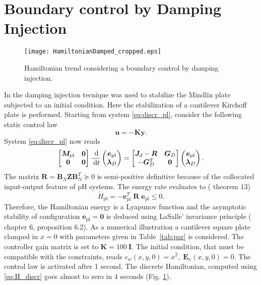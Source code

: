 \documentclass[letterpaper, 10 pt, conference]{ieeeconf}
\begin{document}
\section{Boundary control by Damping Injection}
\begin{figure}[t]
	\centering
	\texttt{[image: HamiltonianDamped\_cropped.eps]}
	\caption{Hamiltonian trend considering a boundary control by damping injection.}
	\label{fig:H_Damped}
\end{figure}
\label{sec:Damp}
In \cite{MacchelliMindlin} the damping injection tecnique was used to stabilize the Mindlin plate subjected to an initial condition. Here the stabilization of a cantilever Kirchoff plate is performed. Starting from system \eqref{eq:discr_pl}, consider the following static control law
\begin{equation}
\bm{u} = -\bm{K} \bm{y}.
\end{equation}
System \eqref{eq:discr_pl} now reads
\begin{equation}
\begin{bmatrix}
\bm{M}_{\text{pl}} & \bm{0} \\
\bm{0} & \bm{0} \\
\end{bmatrix}\frac{\d}{\d t}
\begin{pmatrix}
\bm{e}_{\text{pl}}\\
\bm{\lambda}_D \\
\end{pmatrix}
= \begin{bmatrix}
\bm{J}_d - \bm{R} & \bm{G}_D \\
-\bm{G}_D^T & \bm{0} \\
\end{bmatrix}
\begin{pmatrix}
\bm{e}_{\text{pl}}\\
\bm{\lambda}_D \\
\end{pmatrix}.
\end{equation}
The matrix $\bm{R} = \bm{B}_N \bm{Z} \bm{B}_N^T \succcurlyeq 0$ is semi-positive definitive because of the collocated input-output feature of pH systems. The energy rate evaluates to (\cite{beattie2018linear} theorem 13)
\[\dot{H} _{\text{pl}} = - \bm{e}_{\text{pl}}^T \; \bm{R} \; \bm{e}_{\text{pl}} \le 0. \]
Therefore, the Hamiltonian energy is a Lyapunov function and the asymptotic stability of configuration $\bm{e}_{\text{pl}} = \bm{0}$ is deduced using LaSalle' invariance  principle (\cite{bookPHs}  chapter 6, proposition 6.2). As a numerical illustration a cantilever square plate clamped in $x=0$ with parameters given in Table~\ref{tab:par} is considered. The controller gain matrix is set to $\bm{K} = 100 \ \bm{I}$. The initial condition, that must be compatible with the constraints, reads $e_w(x,y,0) = x^2, \; \bm{E}_{\kappa}(x,y,0)=0$. The control law is activated after 1 second. The discrete Hamiltonian, computed using \eqref{eq:H_discr} goes almost to zero in 4 seconds (Fig. \ref{fig:H_Damped}). 
\end{document}
